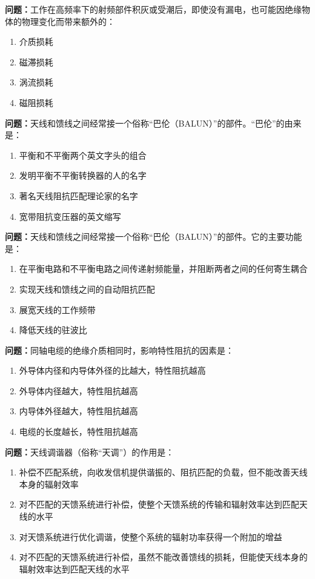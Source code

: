 \bigskip


\noindent\textbf{问题：}工作在高频率下的射频部件积灰或受潮后，即使没有漏电，也可能因绝缘物体的物理变化而带来额外的：
\begin{enumerate}[label=\Alph*), leftmargin=3em]
\item 介质损耗
\item 磁滞损耗
\item 涡流损耗
\item 磁阻损耗
\end{enumerate}

\bigskip


\noindent\textbf{问题：}天线和馈线之间经常接一个俗称“巴伦（BALUN）”的部件。“巴伦”的由来是：
\begin{enumerate}[label=\Alph*), leftmargin=3em]
\item 平衡和不平衡两个英文字头的组合
\item 发明平衡不平衡转换器的人的名字
\item 著名天线阻抗匹配理论家的名字
\item 宽带阻抗变压器的英文缩写
\end{enumerate}

\bigskip


\noindent\textbf{问题：}天线和馈线之间经常接一个俗称“巴伦（BALUN）”的部件。它的主要功能是：
\begin{enumerate}[label=\Alph*), leftmargin=3em]
\item 在平衡电路和不平衡电路之间传递射频能量，并阻断两者之间的任何寄生耦合
\item 实现天线和馈线之间的自动阻抗匹配
\item 展宽天线的工作频带
\item 降低天线的驻波比
\end{enumerate}

\bigskip


\noindent\textbf{问题：}同轴电缆的绝缘介质相同时，影响特性阻抗的因素是：
\begin{enumerate}[label=\Alph*), leftmargin=3em]
\item 外导体内径和内导体外径的比越大，特性阻抗越高
\item 外导体内径越大，特性阻抗越高
\item 内导体外径越大，特性阻抗越高
\item 电缆的长度越长，特性阻抗越高
\end{enumerate}

\bigskip


\noindent\textbf{问题：}天线调谐器（俗称“天调”）的作用是：
\begin{enumerate}[label=\Alph*), leftmargin=3em]
\item 补偿不匹配系统，向收发信机提供谐振的、阻抗匹配的负载，但不能改善天线本身的辐射效率
\item 对不匹配的天馈系统进行补偿，使整个天馈系统的传输和辐射效率达到匹配天线的水平
\item 对天馈系统进行优化调谐，使整个系统的辐射功率获得一个附加的增益
\item 对不匹配的天馈系统进行补偿，虽然不能改善馈线的损耗，但能使天线本身的辐射效率达到匹配天线的水平
\end{enumerate}

